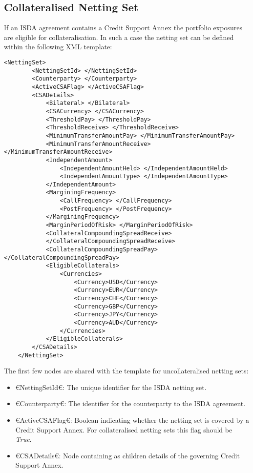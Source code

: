 \subsection{Collateralised Netting Set}
If an ISDA agreement contains a Credit Support Annex the
portfolio exposures are eligible for collateralisation. In such a
case the netting set can be defined within the following XML template:

{\footnotesize
\begin{lstlisting}[caption={collateralised netting set definition}, label=lst:nettingSetCollat]
    <NettingSet>
        <NettingSetId> </NettingSetId>
        <Counterparty> </Counterparty>
        <ActiveCSAFlag> </ActiveCSAFlag>
        <CSADetails>
            <Bilateral> </Bilateral>
            <CSACurrency> </CSACurrency>
            <ThresholdPay> </ThresholdPay>
            <ThresholdReceive> </ThresholdReceive>
            <MinimumTransferAmountPay> </MinimumTransferAmountPay>
            <MinimumTransferAmountReceive> </MinimumTransferAmountReceive>
            <IndependentAmount>
                <IndependentAmountHeld> </IndependentAmountHeld>
                <IndependentAmountType> </IndependentAmountType>
            </IndependentAmount>
            <MarginingFrequency>
                <CallFrequency> </CallFrequency>
                <PostFrequency> </PostFrequency>
            </MarginingFrequency>
            <MarginPeriodOfRisk> </MarginPeriodOfRisk>
            <CollateralCompoundingSpreadReceive> 
            </CollateralCompoundingSpreadReceive>
            <CollateralCompoundingSpreadPay> </CollateralCompoundingSpreadPay>
            <EligibleCollaterals>
                <Currencies>
                    <Currency>USD</Currency>
                    <Currency>EUR</Currency>
                    <Currency>CHF</Currency>
                    <Currency>GBP</Currency>
                    <Currency>JPY</Currency>
                    <Currency>AUD</Currency>
                </Currencies>
            </EligibleCollaterals>
        </CSADetails>
    </NettingSet>
\end{lstlisting}
}

The first few nodes are shared with the template for uncollateralised
netting sets:
\begin{itemize}
\item €NettingSetId€: The unique identifier for the ISDA netting set.
\item €Counterparty€: The identifier for the counterparty to the ISDA agreement.
\item €ActiveCSAFlag€: Boolean indicating whether the netting set is
  covered by a Credit Support Annex. For collateralised netting sets
  this flag should be \emph{True}.
\item €CSADetails€: Node containing as children details of the governing
  Credit Support Annex. 
\end{itemize}

